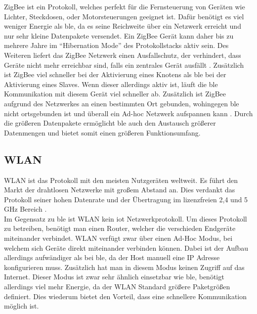 \noindent ZigBee ist ein Protokoll, welches perfekt für die Fernsteuerung von Geräten wie Lichter, Steckdosen, oder Motorsteuerungen geeignet ist. Dafür benötigt es viel weniger Energie als \ac{ble}, da es seine Reichweite über ein Netzwerk erreicht und nur sehr kleine Datenpakete versendet. Ein ZigBee Gerät kann daher bis zu mehrere Jahre im "`Hibernation Mode"' des Protokollstacks aktiv sein. Des Weiteren liefert das ZigBee Netzwerk einen Ausfallschutz, der verhindert, dass Geräte nicht mehr erreichbar sind, falls ein zentrales Gerät ausfällt \cite[Seite 267]{Gessler14:WNN}. Zusätzlich ist ZigBee viel schneller bei der Aktivierung eines Knotens als \ac{ble} bei der Aktivierung eines Slaves. Wenn dieser allerdings aktiv ist, läuft die \ac{ble} Kommunikation mit diesem Gerät viel schneller ab. Zusätzlich ist ZigBee aufgrund des Netzwerkes an einen bestimmten Ort gebunden, wohingegen \ac{ble} nicht ortsgebunden ist und überall ein Ad-hoc Netzwerk aufspannen kann \cite[Seite 270]{Gessler14:WNN}. Durch die größeren Datenpakete ermöglicht \ac{ble} auch den Austausch größerer Datenmengen und bietet somit einen größeren Funktionsumfang.\\

\subsection{WLAN}
\label{ss:vergleich:wifi}

WLAN ist das Protokoll mit den meisten Nutzgeräten weltweit. Es führt den Markt der drahtlosen Netzwerke mit großem Abstand an. Dies verdankt das Protokoll seiner hohen Datenrate und der Übertragung im lizenzfreien 2,4 und 5 GHz Bereich \cite[Seite 193f]{Gessler14:WNN}.\\

\noindent Im Gegensatz zu \ac{ble} ist WLAN kein \ac{iot} Netzwerkprotokoll. Um dieses Protokoll zu betreiben, benötigt man einen Router, welcher die verschieden Endgeräte miteinander verbindet. WLAN verfügt zwar über einen Ad-Hoc Modus, bei welchem sich Geräte direkt miteinander verbinden können. Dabei ist der Aufbau allerdings aufwändiger als bei \ac{ble}, da der Host manuell eine IP Adresse konfigurieren muss. Zusätzlich hat man in diesem Modus keinen Zugriff auf das Internet. Dieser Modus ist zwar sehr ähnlich einsetzbar wie \ac{ble}, benötigt allerdings viel mehr Energie, da der WLAN Standard größere Paketgrößen definiert. Dies wiederum bietet den Vorteil, dass eine schnellere Kommunikation möglich ist.\\

